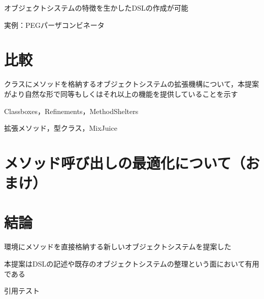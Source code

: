 \documentclass{ipsjprosym}
\begin{document}
オブジェクトシステムの特徴を生かしたDSLの作成が可能

実例：PEGパーザコンビネータ

\section{比較}

クラスにメソッドを格納するオブジェクトシステムの拡張機構について，本提案がより自然な形で同等もしくはそれ以上の機能を提供していることを示す

Classboxes，Refinements，MethodShelters

拡張メソッド，型クラス，MixJuice

\section{メソッド呼び出しの最適化について（おまけ）}

\section{結論}

環境にメソッドを直接格納する新しいオブジェクトシステムを提案した

本提案はDSLの記述や既存のオブジェクトシステムの整理という面において有用である

引用テスト\cite{latex}





\end{document}
